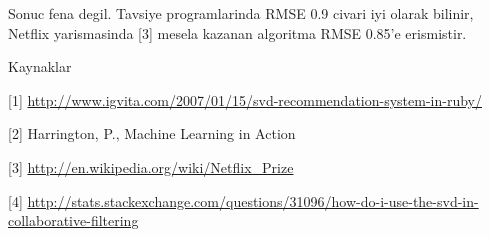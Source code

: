 \documentclass[12pt,fleqn]{article}\usepackage{../common}
\begin{document}
Sonuc fena degil. Tavsiye programlarinda RMSE 0.9 civari iyi olarak
bilinir, Netflix yarismasinda [3] mesela kazanan algoritma RMSE 0.85'e
erismistir.

Kaynaklar

[1] \url{http://www.igvita.com/2007/01/15/svd-recommendation-system-in-ruby/}

[2] Harrington, P., Machine Learning in Action

[3] \url{http://en.wikipedia.org/wiki/Netflix_Prize}

[4] \url{http://stats.stackexchange.com/questions/31096/how-do-i-use-the-svd-in-collaborative-filtering}
\end{document}
